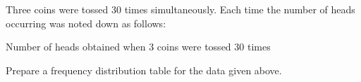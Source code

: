 Three coins were tossed 30 times simultaneously. Each time the number of heads occurring was noted down as follows:\\
\begin{table}[ht!]
\centering

\caption{Number of heads obtained when 3 coins were tossed 30 times}
\label{table:input_33}
\end{table}
Prepare a frequency distribution table for the data given above.\\
